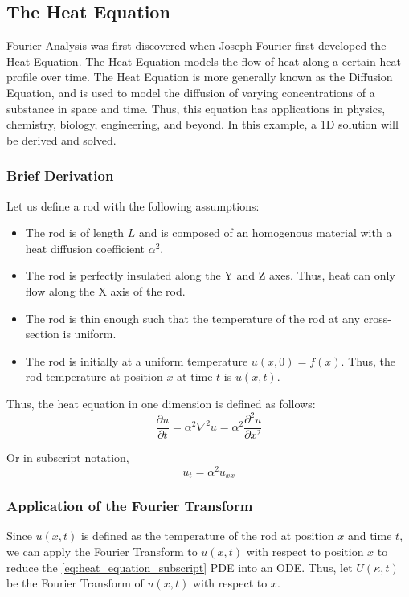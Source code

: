 \subsection{The Heat Equation}
Fourier Analysis was first discovered when Joseph Fourier first developed the Heat Equation. 
The Heat Equation models the flow of heat along a certain heat profile over time. 
The Heat Equation is more generally known as the Diffusion Equation, and is used to model the diffusion of varying concentrations of a substance in space and time.
Thus, this equation has applications in physics, chemistry, biology, engineering, and beyond.
In this example, a 1D solution will be derived and solved.

\subsubsection{Brief Derivation}
\noindent
Let us define a rod with the following assumptions:
\begin{itemize}
    \item The rod is of length \(L\) and is composed of an homogenous material with a heat diffusion coefficient \( \alpha^2 \).
    \item The rod is perfectly insulated along the Y and Z axes. Thus, heat can only flow along the X axis of the rod.
    \item The rod is thin enough such that the temperature of the rod at any cross-section is uniform.
    \item The rod is initially at a uniform temperature \(u(x,0) = f(x)\). Thus, the rod temperature at position \(x\) at time \(t\) is \(u(x,t)\).
\end{itemize}


\noindent
Thus, the heat equation in one dimension is defined as follows:
\begin{equation} \label{eq:heat_equation}
    \frac{\partial u}{\partial t} = \alpha^2 \nabla^2 u = \alpha^2 \frac{\partial^2 u}{\partial x^2}
\end{equation}

\noindent
Or in subscript notation,
\begin{equation} \label{eq:heat_equation_subscript}
    u_t = \alpha^2 u_{xx}
\end{equation}

\subsubsection{Application of the Fourier Transform}
Since \(u(x,t)\) is defined as the temperature of the rod at position \(x\) and time \(t\), we can apply the Fourier Transform to \(u(x,t)\) with respect to position \(x\) to reduce the \cref{eq:heat_equation_subscript} PDE into an ODE. Thus, let \(U(\kappa,t)\) be the Fourier Transform of \(u(x,t)\) with respect to \(x\).

